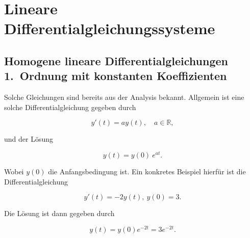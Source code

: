 \setcounter{section}{9}
\section{Lineare Differentialgleichungssysteme}

\subsection{Homogene lineare Differentialgleichungen 1.\ Ordnung mit konstanten Koeffizienten}

Solche Gleichungen sind bereits aus der Analysis bekannt. Allgemein ist eine solche Differentialgleichung gegeben durch

\begin{equation*}
    y'(t)=ay(t), \quad a \in \mathbb{R},
\end{equation*}

und der Lösung

\begin{equation*}
    y(t)= y(0) \ e^{at}.
\end{equation*}

Wobei \( y(0) \) die Anfangsbedingung ist. Ein konkretes Beispiel hierfür ist die Differentialgleichung

\begin{equation*}
    y'(t)=-2y(t),\  y(0) = 3.
\end{equation*}

Die Lösung ist dann gegeben durch 

\begin{figure*}[h]
    \centering
    \begin{minipage}
        {0.5\textwidth}
        \begin{equation*}
            y(t) = y(0) e^{-2t} = 3 e^{-2t}.
        \end{equation*}        
    \end{minipage}
    \hfill
    \begin{minipage}
        {0.45\textwidth}
        \centering
    \end{minipage}
\end{figure*}

